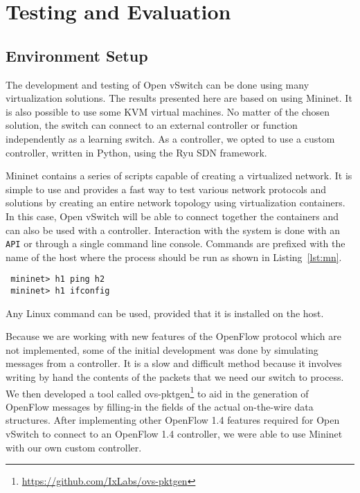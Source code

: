 \chapter{Testing and Evaluation}
\label{chapter:test-eval}

\section{Environment Setup}
\label{section:setup}

The development and testing of Open vSwitch can be done using many virtualization solutions. The
results presented here are based on using Mininet\cite{mn}. It is also possible to use some KVM\cite{kvm}
virtual machines. No matter of the chosen solution, the switch can connect to an
external controller or function independently as a learning switch. As a controller, we opted
to use a custom controller, written in Python, using the Ryu\cite{ryu} SDN framework.

Mininet contains a series of scripts capable of creating a virtualized network. It is simple to
use and provides a fast way to test various network protocols and solutions by creating
an entire network topology using virtualization containers. In this case, Open vSwitch will
be able to connect together the containers and can also be used with a controller.
Interaction with the system is done with an \texttt{API} or through a single command line console.
Commands are prefixed with the name of the host where the process should be run as shown in
Listing~\ref{lst:mn}.
\lstset{caption=Mininet Command Line,label=lst:mn}
\begin{lstlisting}
 mininet> h1 ping h2
 mininet> h1 ifconfig
\end{lstlisting}
Any Linux command can be used, provided that it is installed on the host.

Because we are working with new features of the OpenFlow protocol which are not implemented, some of
the initial development was done by simulating messages from a controller. It is a slow and difficult method
because it involves writing by hand the contents of the packets that we need our switch to process.
We then developed a tool called ovs-pktgen\footnote{\url{https://github.com/IxLabs/ovs-pktgen}}
to aid in the generation of OpenFlow messages by filling-in the fields of the actual on-the-wire
data structures. After implementing other OpenFlow 1.4 features required for Open vSwitch to connect
to an OpenFlow 1.4 controller, we were able to use Mininet with our own custom controller.

